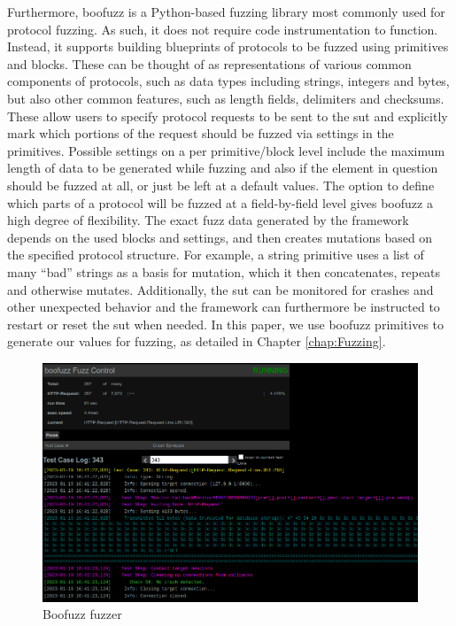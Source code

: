 Furthermore, boofuzz is a Python-based fuzzing library most commonly used for protocol fuzzing. As such, it does not require code instrumentation to function. Instead, it supports building blueprints of protocols to be fuzzed using primitives and blocks. These can be thought of as representations of various common components of protocols, such as data types including strings, integers and bytes, but also other common features, such as length fields, delimiters and checksums. These allow users to specify protocol requests to be sent to the \ac{sut} and explicitly mark which portions of the request should be fuzzed via settings in the primitives. Possible settings on a per primitive/block level include the maximum length of data to be generated while fuzzing and also if the element in question should be fuzzed at all, or just be left at a default values. The option to define which parts of a protocol will be fuzzed at a field-by-field level gives boofuzz a high degree of flexibility. The exact fuzz data generated by the framework depends on the used blocks and settings, and then creates mutations based on the specified protocol structure. For example, a string primitive uses a list of many ``bad'' strings as a basis for mutation, which it then concatenates, repeats and otherwise mutates. Additionally, the \ac{sut} can be monitored for crashes and other unexpected behavior and the framework can furthermore be instructed to restart or reset the \ac{sut} when needed. In this paper, we use boofuzz primitives to generate our values for fuzzing, as detailed in Chapter \ref{chap:Fuzzing}.

\begin{figure}
	\centering
	\includegraphics[width=0.9\linewidth]{images/boofuzz_control_center}
	\caption{Boofuzz fuzzer}
	\label{fig:boofuzzcontrolcenter}
\end{figure}

